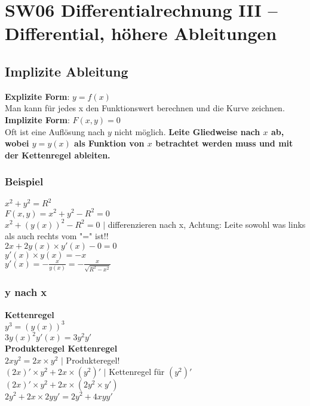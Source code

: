 \documentclass[../main.tex]{subfiles}
\begin{document}

\chapter{SW06 Differentialrechnung III -- Differential, höhere Ableitungen}

\section{Implizite Ableitung}
\textbf{Explizite Form}: $y = f(x)$ \\ [7pt]
Man kann für jedes x den Funktionswert berechnen und die Kurve zeichnen. \\ [7pt]
\textbf{Implizite Form}: $F(x,y) = 0$ \\ [7pt]
Oft ist eine Auflösung nach $y$ nicht möglich. \textbf{Leite Gliedweise nach $x$ ab, wobei $y = y(x)$ als Funktion von $x$ betrachtet werden muss und mit der Kettenregel ableiten.}

\subsection{Beispiel}
$x^2 + y^2 = R^2$ \\ [7pt]
$F(x,y) = x^2 + y^2 -R^2 = 0$ \\ [7pt]
$x^2 + (y(x))^2 -R^2 = 0$ $|$ differenzieren nach x, Achtung: Leite sowohl was links als auch rechts vom "=" ist!! \\ [7pt]
$2x + 2y(x) \times y'(x) -0 = 0$ \\ [7pt]
$y'(x) \times y(x) = -x$ \\ [7pt]
$y'(x) = -\frac{x}{y(x)} = -\frac{x}{\sqrt{R^2-x^2}}$

\subsection{y nach x}
\textbf{Kettenregel} \\ [7pt]
$y^3 = (y(x))^3$ \\ [7pt]
$3y(x)^2y'(x) = 3y^2y'$ \\ [14pt]
\textbf{Produkteregel Kettenregel} \\ [7pt]
$2xy^2 = 2x \times y^2$ $|$ Produkteregel!  \\ [7pt]
$(2x)' \times y^2 + 2x \times (y^2)'$ $|$ Kettenregel für $(y^2)'$\\ [7pt]
$(2x)' \times y^2 + 2x \times (2y^2 \times y')$ \\ [7pt]
$2y^2 + 2x \times 2yy' = 2y^2+4xyy'$
\end{document}
